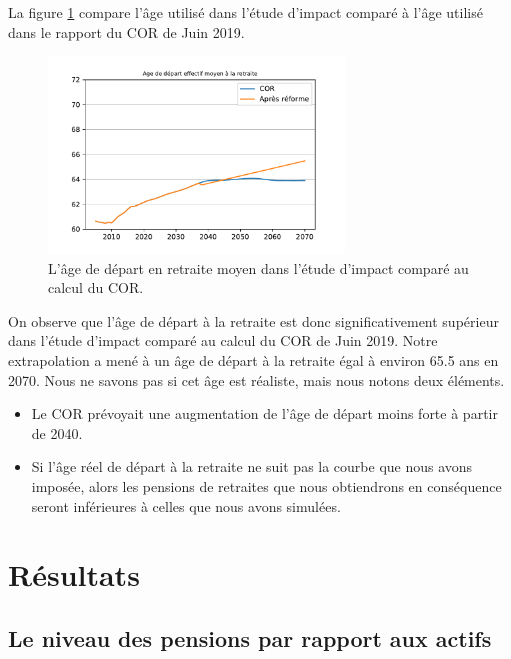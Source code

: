 \documentclass[10pt]{article}
\begin{document}
La figure \ref{fig-simulation-A-vs-COR} compare l'âge utilisé 
dans l'étude d'impact comparé à l'âge utilisé dans le rapport du COR 
de Juin 2019.

\begin{figure}
\begin{center}
\includegraphics[width=0.7\textwidth]{Simulation-Age-vs-COR.pdf}
\end{center}
\caption{L'âge de départ en retraite moyen dans l'étude d'impact comparé 
au calcul du COR.}
\label{fig-simulation-A-vs-COR}
\end{figure}

On observe que l'âge de départ à la retraite est donc 
significativement supérieur dans l'étude d'impact comparé au calcul du COR de Juin 2019. 
Notre extrapolation a mené à un âge de départ à la retraite égal à 
environ 65.5 ans en 2070. 
Nous ne savons pas si cet âge est réaliste, mais nous notons deux éléments. 
\begin{itemize}
\item Le COR prévoyait une augmentation de l'âge de départ moins 
forte à partir de 2040. 
\item Si l'âge réel de départ à la retraite ne suit pas la courbe 
que nous avons imposée, alors les pensions de retraites que nous 
obtiendrons en conséquence seront inférieures à celles que nous avons 
simulées. 
\end{itemize}


\section{Résultats}


\subsection{Le niveau des pensions par rapport aux actifs}
\end{document}
